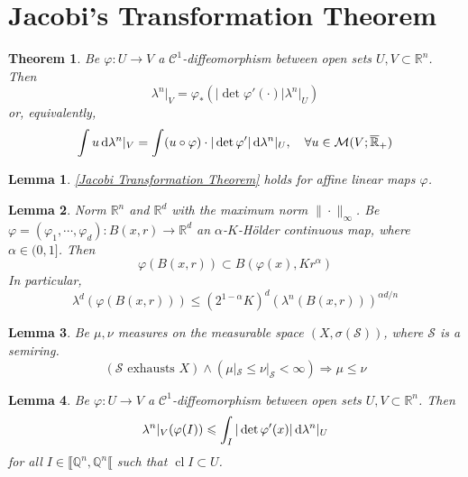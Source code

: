 \documentclass[11pt, a4paper, openany]{book}
\newtheorem{thm}{Theorem}\newtheorem{lem}{Lemma}\newtheorem{crl}{Corollary}
\theoremstyle{definition}
\DeclareMathOperator{\cl}{cl}
\begin{document}
\section{Jacobi's Transformation Theorem}
    \begin{thm}\label{Jacobi Transformation Theorem}
        Be $\varphi:U\rightarrow V$ a $\mathcal{C}^1$-diffeomorphism between open sets $U,V\subset\mathbb{R}^n$. Then
        \[
            \lambda^n|_V=\varphi_*(|\det \varphi'(\cdot)|\lambda^n|_U)
        \]
        or, equivalently,
        \[\int u\odif \lambda^n|_V=\int (u\circ \varphi)\cdot|\det\varphi'|\odif \lambda^n|_U,\quad\forall u\in\mathcal{M}(V;\overline{\mathbb{R}}_+)\]
    \end{thm}


    \begin{lem}
        \autoref{Jacobi Transformation Theorem} holds for affine linear maps $\varphi$.
    \end{lem}
    \begin{lem}
        Norm $\mathbb{R}^n$ and $\mathbb{R}^d$ with the maximum norm $\|\cdot\|_\infty$.
        Be $\varphi=(\varphi_1,\cdots,\varphi_d):B(x,r)\rightarrow \mathbb{R}^d$ an $\alpha$-$K$-H\"{o}lder continuous map, where $\alpha\in(0,1]$. Then
        \[\varphi\left(B(x,r)\right)\subset B(\varphi(x),Kr^\alpha)\]
        In particular,
        \[
            \lambda^d(\varphi(B(x,r)))\leqslant (2^{1-\alpha}K)^d(\lambda^n(B(x,r)))^{\alpha d/n}
        \]
    \end{lem}
    \begin{lem}
        Be $\mu,\nu$ measures on the measurable space $(X,\sigma(\mathscr{S}))$, where $\mathscr{S}$ is a semiring.
        \[(\mathscr{S}\text{ exhausts }X)\wedge (\mu|_\mathscr{S}\leqslant\nu|_\mathscr{S}<\infty)\Longrightarrow \mu\leqslant\nu\]
    \end{lem}
    \begin{lem}
        Be $\varphi:U\rightarrow V$ a $\mathcal{C}^1$-diffeomorphism between open sets $U,V\subset\mathbb{R}^n$. Then
        \[\lambda^n|_V(\varphi(I))\leqslant \int_I |\det \varphi'(x)|\odif \lambda^n|_U\]
        for all $I\in\llbracket \mathbb{Q}^n,\mathbb{Q}^n\llbracket$ such that $\cl I\subset U$.
    \end{lem}
\end{document}
